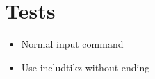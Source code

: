 \documentclass{article}
\begin{document}
	\section*{Tests}
	\begin{itemize}
		\item Normal input command\\%
		\item Use includtikz without ending\\%
	\end{itemize}
\end{document}
